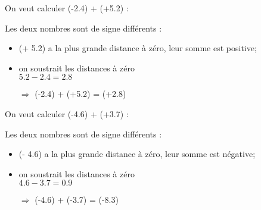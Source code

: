 \begin{myexs}
		On veut calculer (-\num{2.4}) + (+\num{5.2}) :
		
		Les deux nombres sont de signe différents :
		\begin{itemize}
			\item (+ \num{5.2}) a la plus grande distance à zéro, leur somme est positive;
			\item on soustrait les distances à zéro \\ $\num{5.2} - \num{2.4} = \num{2.8}$
			\item[$\Rightarrow$] (-\num{2.4}) + (+\num{5.2}) = (+\num{2.8})
		\end{itemize} 
		
		\vspace*{1cm}
		
		On veut calculer (-\num{4.6}) + (+\num{3.7}) :
		
		Les deux nombres sont de signe différents :
		\begin{itemize}
			\item (- \num{4.6}) a la plus grande distance à zéro, leur somme est négative;
			\item on soustrait les distances à zéro \\ $\num{4.6} - \num{3.7} = \num{0.9}$
			\item[$\Rightarrow$] (-\num{4.6}) + (-\num{3.7}) = (-\num{8.3})
		\end{itemize} 
\end{myexs}